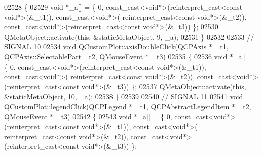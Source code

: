 \begin{DoxyCode}
02528 \{
02529     \textcolor{keywordtype}{void} *\_a[] = \{ 0, \textcolor{keyword}{const\_cast<}\textcolor{keywordtype}{void}*\textcolor{keyword}{>}(\textcolor{keyword}{reinterpret\_cast<}\textcolor{keyword}{const }\textcolor{keywordtype}{void}*\textcolor{keyword}{>}(&\_t1)), \textcolor{keyword}{const\_cast<}\textcolor{keywordtype}{void}*\textcolor{keyword}{>}(\textcolor{keyword}{
      reinterpret\_cast<}\textcolor{keyword}{const }\textcolor{keywordtype}{void}*\textcolor{keyword}{>}(&\_t2)), \textcolor{keyword}{const\_cast<}\textcolor{keywordtype}{void}*\textcolor{keyword}{>}(\textcolor{keyword}{reinterpret\_cast<}\textcolor{keyword}{const }\textcolor{keywordtype}{void}*\textcolor{keyword}{>}(&\_t3)) \};
02530     QMetaObject::activate(\textcolor{keyword}{this}, &staticMetaObject, 9, \_a);
02531 \}
02532 
02533 \textcolor{comment}{// SIGNAL 10}
02534 \textcolor{keywordtype}{void} QCustomPlot::axisDoubleClick(QCPAxis * \_t1, QCPAxis::SelectablePart \_t2, QMouseEvent * \_t3)
02535 \{
02536     \textcolor{keywordtype}{void} *\_a[] = \{ 0, \textcolor{keyword}{const\_cast<}\textcolor{keywordtype}{void}*\textcolor{keyword}{>}(\textcolor{keyword}{reinterpret\_cast<}\textcolor{keyword}{const }\textcolor{keywordtype}{void}*\textcolor{keyword}{>}(&\_t1)), \textcolor{keyword}{const\_cast<}\textcolor{keywordtype}{void}*\textcolor{keyword}{>}(\textcolor{keyword}{
      reinterpret\_cast<}\textcolor{keyword}{const }\textcolor{keywordtype}{void}*\textcolor{keyword}{>}(&\_t2)), \textcolor{keyword}{const\_cast<}\textcolor{keywordtype}{void}*\textcolor{keyword}{>}(\textcolor{keyword}{reinterpret\_cast<}\textcolor{keyword}{const }\textcolor{keywordtype}{void}*\textcolor{keyword}{>}(&\_t3)) \};
02537     QMetaObject::activate(\textcolor{keyword}{this}, &staticMetaObject, 10, \_a);
02538 \}
02539 
02540 \textcolor{comment}{// SIGNAL 11}
02541 \textcolor{keywordtype}{void} QCustomPlot::legendClick(QCPLegend * \_t1, QCPAbstractLegendItem * \_t2, QMouseEvent * \_t3)
02542 \{
02543     \textcolor{keywordtype}{void} *\_a[] = \{ 0, \textcolor{keyword}{const\_cast<}\textcolor{keywordtype}{void}*\textcolor{keyword}{>}(\textcolor{keyword}{reinterpret\_cast<}\textcolor{keyword}{const }\textcolor{keywordtype}{void}*\textcolor{keyword}{>}(&\_t1)), \textcolor{keyword}{const\_cast<}\textcolor{keywordtype}{void}*\textcolor{keyword}{>}(\textcolor{keyword}{
      reinterpret\_cast<}\textcolor{keyword}{const }\textcolor{keywordtype}{void}*\textcolor{keyword}{>}(&\_t2)), \textcolor{keyword}{const\_cast<}\textcolor{keywordtype}{void}*\textcolor{keyword}{>}(\textcolor{keyword}{reinterpret\_cast<}\textcolor{keyword}{const }\textcolor{keywordtype}{void}*\textcolor{keyword}{>}(&\_t3)) \};

\end{DoxyCode}
